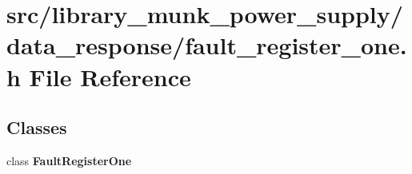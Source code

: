 \section{src/library\+\_\+munk\+\_\+power\+\_\+supply/data\+\_\+response/fault\+\_\+register\+\_\+one.h File Reference}
\label{fault__register__one_8h}
\subsection*{Classes}
\begin{DoxyCompactItemize}
\item 
class \textbf{ Fault\+Register\+One}
\end{DoxyCompactItemize}
